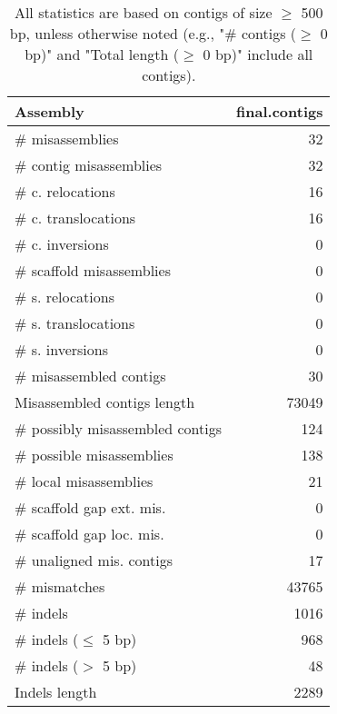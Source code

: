 \documentclass[12pt,a4paper]{article}
\begin{document}
\begin{table}[ht]
\begin{center}
\caption{All statistics are based on contigs of size $\geq$ 500 bp, unless otherwise noted (e.g., "\# contigs ($\geq$ 0 bp)" and "Total length ($\geq$ 0 bp)" include all contigs).}
\begin{tabular}{|l*{1}{|r}|}
\hline
Assembly & final.contigs \\ \hline
\# misassemblies & 32 \\ \hline
\hspace{2mm}\# contig misassemblies & 32 \\ \hline
\hspace{5mm}\# c. relocations & 16 \\ \hline
\hspace{5mm}\# c. translocations & 16 \\ \hline
\hspace{5mm}\# c. inversions & 0 \\ \hline
\hspace{2mm}\# scaffold misassemblies & 0 \\ \hline
\hspace{5mm}\# s. relocations & 0 \\ \hline
\hspace{5mm}\# s. translocations & 0 \\ \hline
\hspace{5mm}\# s. inversions & 0 \\ \hline
\# misassembled contigs & 30 \\ \hline
Misassembled contigs length & 73049 \\ \hline
\# possibly misassembled contigs & 124 \\ \hline
\hspace{5mm}\# possible misassemblies & 138 \\ \hline
\# local misassemblies & 21 \\ \hline
\# scaffold gap ext. mis. & 0 \\ \hline
\# scaffold gap loc. mis. & 0 \\ \hline
\# unaligned mis. contigs & 17 \\ \hline
\# mismatches & 43765 \\ \hline
\# indels & 1016 \\ \hline
\hspace{5mm}\# indels ($\leq$ 5 bp) & 968 \\ \hline
\hspace{5mm}\# indels ($>$ 5 bp) & 48 \\ \hline
Indels length & 2289 \\ \hline
\end{tabular}
\end{center}
\end{table}
\end{document}
